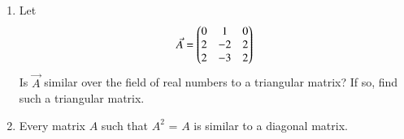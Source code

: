 \renewcommand{\theequation}{\theenumi}
\renewcommand{\thefigure}{\theenumi}
\begin{enumerate}[label=\thesubsection.\arabic*.,ref=\thesubsection.\theenumi]

\item %
Let
\begin{align}
    \Vec{A}=\begin{pmatrix}0&1&0\\2&-2&2\\2&-3&2\end{pmatrix}
\end{align}
Is $\vec{A}$ similar over the field of real numbers to a triangular matrix? If so, find such a triangular matrix.
\\
\solution

\twocolumn


\item  Every matrix $A$ such that $A^2$ = $A$ is similar to a diagonal matrix.
%
\\
\solution

\twocolumn
\end{enumerate}
